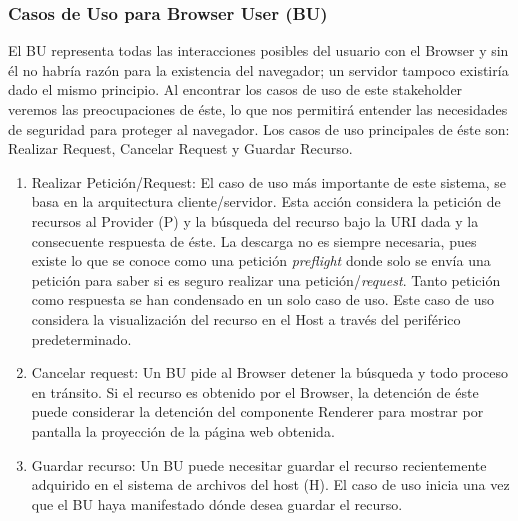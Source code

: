 \subsubsection{Casos de Uso para Browser User (BU)}
		El BU representa todas las interacciones posibles del usuario con el Browser y sin él no habría razón para la existencia del navegador; un servidor tampoco existiría dado el mismo principio. Al encontrar los casos de uso de este stakeholder veremos las preocupaciones de éste, lo que nos permitirá entender las necesidades de seguridad para proteger al navegador. Los casos de uso principales de éste son: Realizar Request, Cancelar Request y Guardar Recurso.
			\begin{enumerate}	
				\item Realizar Petición/Request: El caso de uso más importante de este sistema, se basa en la arquitectura cliente/servidor. Esta acción considera la petición de recursos al Provider (P) y la búsqueda del recurso bajo la URI dada y la consecuente respuesta de éste. La descarga no es siempre necesaria, pues existe lo que se conoce como una petición \textit{preflight} donde solo se envía una petición para saber si es seguro realizar una petición/\textit{request}. Tanto petición como respuesta se han condensado en un solo caso de uso. Este caso de uso considera la visualización del recurso en el Host a través del periférico predeterminado.
				\item Cancelar request: Un BU pide al Browser detener la búsqueda y todo proceso en tránsito. Si el recurso es obtenido por el Browser, la detención de éste puede considerar la detención del componente Renderer para mostrar por pantalla la proyección de la página web obtenida.			
				\item Guardar recurso: Un BU puede necesitar guardar el recurso recientemente adquirido en el sistema de archivos del host (H). El caso de uso inicia una vez que el BU haya manifestado dónde desea guardar el recurso.
			\end{enumerate}

